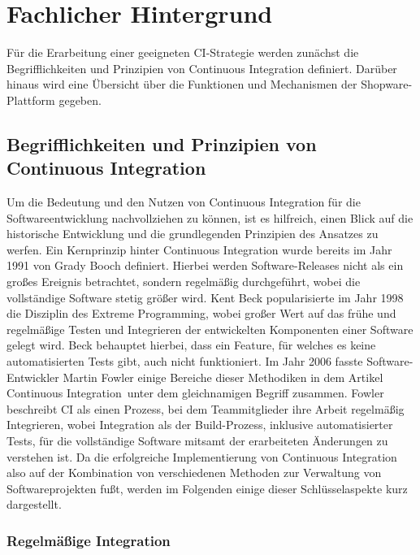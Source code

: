 
\section{Fachlicher Hintergrund} \label{sec:02-background}

Für die Erarbeitung einer geeigneten CI-Strategie werden zunächst die Begrifflichkeiten und Prinzipien von
Continuous Integration definiert.
Darüber hinaus wird eine Übersicht über die Funktionen und Mechanismen der Shopware-Plattform gegeben.

\subsection{Begrifflichkeiten und Prinzipien von Continuous Integration} \label{subsec:02-background-1}

Um die Bedeutung und den Nutzen von Continuous Integration für die Softwareentwicklung nachvollziehen zu können,
ist es hilfreich, einen Blick auf die historische Entwicklung und die grundlegenden Prinzipien des Ansatzes zu werfen.
Ein Kernprinzip hinter Continuous Integration wurde bereits im Jahr 1991 von Grady Booch definiert.
Hierbei werden Software-Releases nicht als ein großes Ereignis betrachtet, sondern regelmäßig durchgeführt, wobei
die vollständige Software stetig größer wird.
Kent Beck popularisierte im Jahr 1998 die Disziplin des \glqq Extreme Programming\grqq, wobei großer Wert auf das frühe
und regelmäßige Testen und Integrieren der entwickelten Komponenten einer Software gelegt wird.
Beck behauptet hierbei, dass ein Feature, für welches es keine automatisierten Tests gibt, auch nicht funktioniert.
Im Jahr 2006 fasste Software-Entwickler Martin Fowler einige Bereiche dieser Methodiken in dem Artikel
\glqq Continuous Integration\grqq\ unter dem gleichnamigen Begriff zusammen.
Fowler beschreibt CI als einen Prozess, bei dem Teammitglieder ihre Arbeit regelmäßig Integrieren,
wobei Integration als der Build-Prozess, inklusive automatisierter Tests, für die vollständige Software mitsamt der
erarbeiteten Änderungen zu verstehen ist.
Da die erfolgreiche Implementierung von Continuous Integration also auf der Kombination von verschiedenen Methoden zur
Verwaltung von Softwareprojekten fußt, werden im Folgenden einige dieser Schlüsselaspekte kurz dargestellt.

\subsubsection{Regelmäßige Integration}

